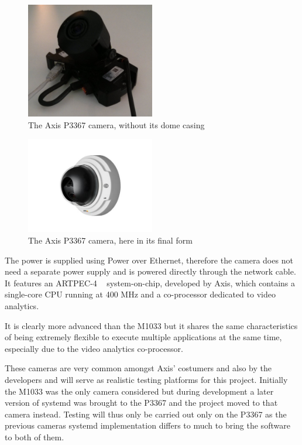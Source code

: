 \documentclass[nobiblatex]{LTHthesis}
\begin{document}
\begin{figure}[h]
    \centering
    \includegraphics[width=0.5\textwidth]{p3367}
    \caption{The Axis P3367 camera, without its dome casing}
    \label{fig:P3367}
\end{figure}

\begin{figure}[h]
    \centering
    \includegraphics[width=0.5\textwidth]{p3367incase}
    \caption{The Axis P3367 camera, here in its final form}
    \label{fig:P3367}
\end{figure}


The power is supplied using Power over Ethernet, therefore the camera does 
not need a separate power supply and is powered directly through the network
cable. It features an ARTPEC-4 ~\cite{artpec-4} system-on-chip, developed by Axis, which
contains a single-core CPU running at 400 MHz and a co-processor dedicated
to video analytics.

It is clearly more advanced than the M1033 but it shares the same
characteristics of being extremely flexible to execute multiple applications
at the same time, especially due to the video analytics co-processor.

These cameras are very common amongst Axis' costumers and also by the developers and will serve as realistic testing platforms for this project. Initially the M1033 was the only camera considered but during development a later version of systemd was brought to the P3367 and the project moved to that camera instead. Testing will thus only be carried out only on the P3367 as the previous cameras systemd implementation differs to much to bring the software to both of them.
\end{document}
